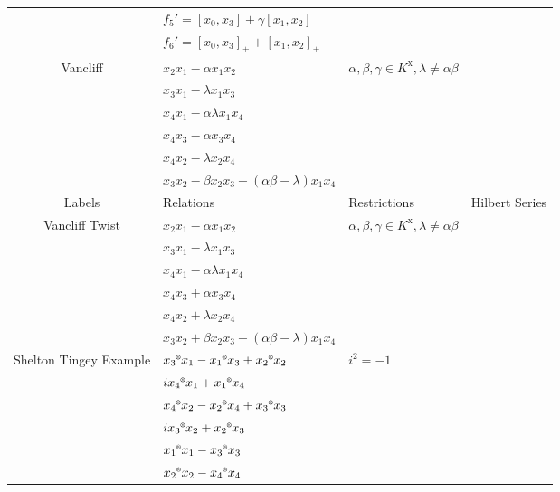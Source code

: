 \documentclass[12]{article}
\DeclareMathOperator{\x}{x}
\begin{document}
\begin{longtable}[c]{|c|p{5.75cm}|p{2.8cm}|c|}
   & $ f_5' = [x_0, x_3] + \gamma [x_1, x_2] $ & & \\ 
   & $ f_6' = [x_0, x_3]_+ + [x_1, x_2]_+ $ & &  \\  
\hline
Vancliff & $ x_2x_1 -  \alpha x_1x_2 $ &\multirow{6}{*}{$\alpha, \beta, \gamma \in K^{\x}, \lambda \neq \alpha \beta $} & \\ 
 & $ x_3x_1 - \lambda x_1x_3 $ & &  \\ 
   & $ x_4x_1 - \alpha \lambda x_1x_4 $ & & \\  
   & $ x_4x_3 - \alpha x_3x_4 $& & \\  
   & $ x_4x_2 - \lambda x_2x_4 $ & & \\ 
   & $ x_3x_2 - \beta x_2x_3 - ( \alpha \beta - \lambda) x_1x_4 $ & &  \\  
\hline
\pagebreak
\midrule[1.0pt]
Labels & Relations & Restrictions & Hilbert Series \\
\hline
Vancliff Twist &  $ x_2x_1 -  \alpha x_1x_2 $ &\multirow{6}{*}{$\alpha, \beta, \gamma \in K^{\x}, \lambda \neq \alpha \beta $} & \\ 
 & $ x_3x_1 - \lambda x_1x_3 $ & &  \\ 
   & $ x_4x_1 - \alpha \lambda x_1x_4 $ & & \\  
   & $ x_4x_3 + \alpha x_3x_4 $& & \\  
   & $ x_4x_2 +\lambda x_2x_4 $ & & \\ 
   & $ x_3x_2 + \beta x_2x_3 - ( \alpha \beta - \lambda) x_1x_4 $ & &  \\ 
\hline
Shelton Tingey Example & $ x_3\textsuperscript {\tiny\textregistered} x_1 - x_1\textsuperscript {\tiny\textregistered} x_3 + x_2\textsuperscript {\tiny\textregistered}x_2$ &\multirow{6}{*}{$ i^2 = -1 $} & \\ 
 & $ix_4\textsuperscript {\tiny\textregistered}x_1 + x_1\textsuperscript {\tiny\textregistered}x_4 $ & &  \\ 
   & $ x_4\textsuperscript {\tiny\textregistered}x_2 - x_2\textsuperscript {\tiny\textregistered}x_4 + x_3\textsuperscript {\tiny\textregistered}x_3 $ & & \\  
   & $ ix_3\textsuperscript {\tiny\textregistered}x_2 + x_2\textsuperscript {\tiny\textregistered}x_3 $ & & \\  
   & $ x_1\textsuperscript {\tiny\textregistered} x_1 - x_3\textsuperscript {\tiny\textregistered} x_3  $ & & \\ 
   & $ x_2\textsuperscript {\tiny\textregistered} x_2 - x_4\textsuperscript {\tiny\textregistered} x_4 $ & &  \\  
\bottomrule
\end{longtable}
\end{document}
